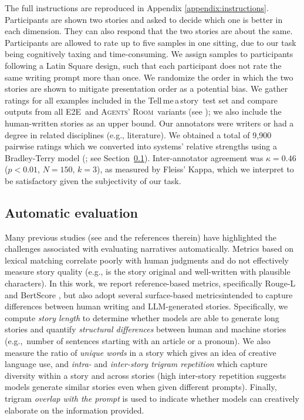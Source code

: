 \documentclass{article}
\newcommand{\Agentsroom}{\textsc{Agents' Room}}
\newcommand{\baseline}{{\sc E2E}}
\newcommand{\tellmeastory}{{\sc Tell$\,$me$\,$a$\,$story}}
\newcommand{\fantine}[1]{{\textcolor{blue}{\bf{Fantine:} \emph{#1}}}}
\begin{document}
The full instructions are reproduced in Appendix
\ref{appendix:instructions}. Participants are shown two stories and
asked to decide which one is better in each dimension. They can also
respond that the two stories are about the same. Participants are
allowed to rate up to five samples in one sitting, due to our task
being cognitively taxing and time-consuming. We assign samples to
participants following a Latin Square design, such that each
participant does not rate the same writing prompt more than once.  We
randomize the order in which the two stories are shown to mitigate
presentation order as a potential bias. We gather ratings for all
examples included in the \tellmeastory\ test set and compare outputs
from all \baseline\ and \Agentsroom\ variants (see
); we also include the human-written
stories as an upper bound.  Our annotators were writers or had a
degree in related disciplines (e.g., literature).  We obtained a total
of 9,900 pairwise ratings which we converted into systems' relative
strengths using a Bradley-Terry model (\citealt{bradley1952rank}; see
Section~\ref{sec:automatic:eval}).  Inter-annotator agreement was
$\kappa = 0.46$ (\mbox{$p<0.01$}, $N=150$, $k=3$), as measured by
Fleiss' Kappa, which we interpret to be satisfactory given the
subjectivity of our task.




\subsection{Automatic evaluation}
\label{sec:automatic:eval}

Many previous studies (see  \citealt{yang2024makesgoodstorymeasure} and the references therein) have highlighted the challenges
associated with evaluating narratives automatically. Metrics based on
lexical matching correlate poorly with human judgments
\citep{chhun-etal-2022-human,chakrabarty:ea:2024a} and do not
effectively measure story quality (e.g., is the story original and
well-written with plausible characters). In this work, we report
reference-based metrics, specifically Rouge-L \citep{lin-2004-rouge} and  BertScore \citep{bertscore:2020}, but also adopt
several surface-based metrics\footnotemark[1] intended to capture differences between
human writing and LLM-generated stories. Specifically, we compute
\emph{story length} to determine whether models are able to generate
long stories and  quantify  \emph{structural differences} between human and machine stories  (e.g.,~number
of sentences starting with an article or a pronoun). We also  measure the ratio of
\emph{unique words} in a story which gives an idea of creative
language use, and \emph{intra-} and \emph{inter-story trigram repetition}
\citep{yao2019plan,goldfarb-tarrant-etal-2020-content} which capture
diversity within a story and across stories (high inter-story repetition
suggests  models  generate similar  stories even when given
different prompts). Finally, trigram \emph{overlap with the prompt} is used to indicate 
whether models can creatively elaborate on the information provided.
\end{document}
